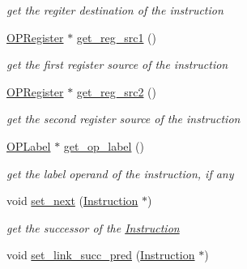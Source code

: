 \begin{DoxyCompactItemize}
\begin{DoxyCompactList}\small\item\em get the regiter destination of the instruction \end{DoxyCompactList}\item 
\hypertarget{class_instruction_ac353a6ad2b3f3b1aee179d5910b5127b}{\hyperlink{class_o_p_register}{O\+P\+Register} $\ast$ \hyperlink{class_instruction_ac353a6ad2b3f3b1aee179d5910b5127b}{get\+\_\+reg\+\_\+src1} ()}\label{class_instruction_ac353a6ad2b3f3b1aee179d5910b5127b}

\begin{DoxyCompactList}\small\item\em get the first register source of the instruction \end{DoxyCompactList}\item 
\hypertarget{class_instruction_a0eb007b1b0a038610e71a58af3bb6438}{\hyperlink{class_o_p_register}{O\+P\+Register} $\ast$ \hyperlink{class_instruction_a0eb007b1b0a038610e71a58af3bb6438}{get\+\_\+reg\+\_\+src2} ()}\label{class_instruction_a0eb007b1b0a038610e71a58af3bb6438}

\begin{DoxyCompactList}\small\item\em get the second register source of the instruction \end{DoxyCompactList}\item 
\hypertarget{class_instruction_aa32973fb1e9e24659095e4795c153c8a}{\hyperlink{class_o_p_label}{O\+P\+Label} $\ast$ \hyperlink{class_instruction_aa32973fb1e9e24659095e4795c153c8a}{get\+\_\+op\+\_\+label} ()}\label{class_instruction_aa32973fb1e9e24659095e4795c153c8a}

\begin{DoxyCompactList}\small\item\em get the label operand of the instruction, if any \end{DoxyCompactList}\item 
\hypertarget{class_instruction_a2fb436e52a0cc89e7ec08bf0e105bba3}{void \hyperlink{class_instruction_a2fb436e52a0cc89e7ec08bf0e105bba3}{set\+\_\+next} (\hyperlink{class_instruction}{Instruction} $\ast$)}\label{class_instruction_a2fb436e52a0cc89e7ec08bf0e105bba3}

\begin{DoxyCompactList}\small\item\em get the successor of the \hyperlink{class_instruction}{Instruction} \end{DoxyCompactList}\item 
\hypertarget{class_instruction_ab8f6e21bc94df2198678a3cdbcfaa12e}{void \hyperlink{class_instruction_ab8f6e21bc94df2198678a3cdbcfaa12e}{set\+\_\+link\+\_\+succ\+\_\+pred} (\hyperlink{class_instruction}{Instruction} $\ast$)}\label{class_instruction_ab8f6e21bc94df2198678a3cdbcfaa12e}


\end{DoxyCompactItemize}

